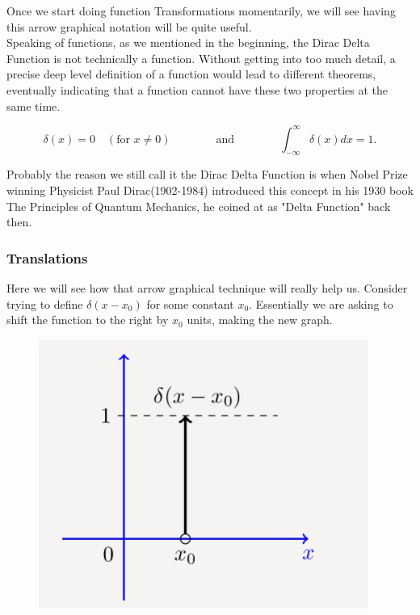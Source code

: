 \documentclass[12pt]{article}
\begin{document}
Once we start doing function Transformations momentarily, we will see having this arrow graphical notation will be quite useful. \\

Speaking of functions, as we mentioned in the beginning, the Dirac Delta Function is not technically a function. Without getting into too much detail, a precise deep level definition of a function would lead to different theorems, eventually indicating that a function cannot have these two properties at the same time.

\begin{equation*}
    \delta(x)=0 \quad (\text{for } x\neq0) \qquad \qquad \text{and} \qquad \qquad \int_{-\infty}^{\infty} \delta(x)dx=1.
\end{equation*}

Probably the reason we still call it the Dirac Delta Function is when Nobel Prize winning Physicist Paul Dirac(1902-1984) introduced this concept in his 1930 book The Principles of Quantum Mechanics, he coined at as "Delta Function" back then. 

\subsubsection{Translations}

Here we will see how that arrow graphical technique will really help us. Consider trying to define $\delta(x-x_0)$ for some constant $x_0$. Essentially we are asking to shift the function to the right by $x_0$ units, making the new graph.

\pagebreak

\begin{figure}[!htbp]
\centering
\includegraphics[scale=.8]{step12.PNG}
\label{fig:hsf12}
\end{figure}
\end{document}
